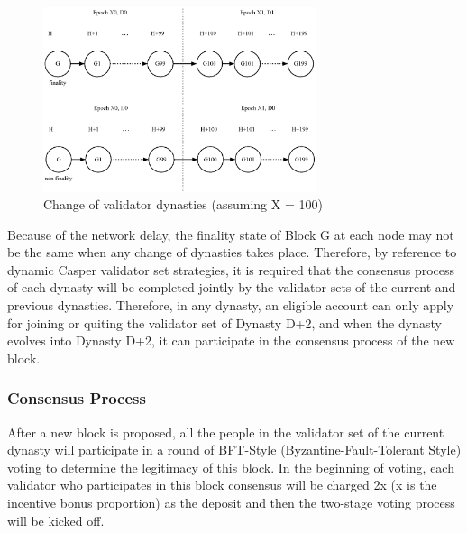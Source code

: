 \begin{figure}[h]
\centering
\includegraphics[width=8cm]{./figs/epoch}
\caption{Change of validator dynasties (assuming X = 100)}
\label{fig:epoch}
\end{figure}

Because of the network delay, the finality state of Block G at each node may not be the same when any change of dynasties takes place. Therefore, by reference to dynamic Casper validator set strategies, it is required that the consensus process of each dynasty will be completed jointly by the validator sets of the current and previous dynasties. Therefore, in any dynasty, an eligible account can only apply for joining or quiting the validator set of Dynasty D+2, and when the dynasty evolves into Dynasty D+2, it can participate in the consensus process of the new block.


\subsubsection{Consensus Process}
\label{pod:design:consensus}

After a new block is proposed, all the people in the validator set of the current dynasty will participate in a round of BFT-Style (Byzantine-Fault-Tolerant Style) voting to determine the legitimacy of this block. In the beginning of voting, each validator who participates in this block consensus will be charged 2x (x is the incentive bonus proportion) as the deposit and then the two-stage voting process will be kicked off.


